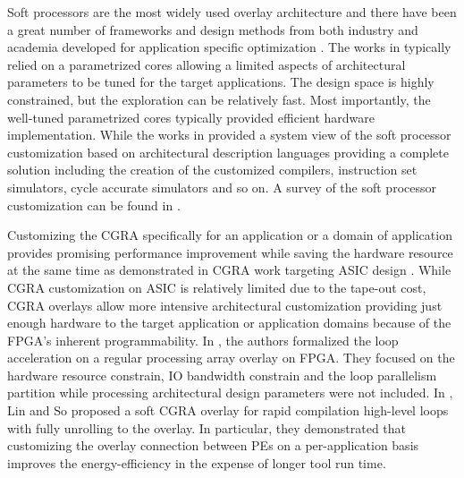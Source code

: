 Soft processors are the most widely used overlay architecture and there have been a great number of frameworks and design methods from both industry and academia developed for application specific optimization \cite{nios, microblaze,lodi2003pipelined, gries2004methods, leon, itoh2000peas, yiannacouras2005microarchitecture, dimond2005custard, chattopadhyay2006automatic}. The works in \cite{lodi2003pipelined, gries2004methods, nios, microblaze, leon} typically relied on a parametrized cores allowing a limited aspects of architectural parameters to be tuned for the target applications. The design space is highly constrained, but the exploration can be relatively fast. Most importantly, the well-tuned parametrized cores typically provided efficient hardware implementation. While the works in \cite{itoh2000peas, yiannacouras2005microarchitecture, dimond2005custard, chattopadhyay2006automatic} provided a system view of the soft processor customization based on architectural description languages providing a complete solution including the creation of the customized compilers, instruction set simulators, cycle accurate simulators and so on. A survey of the soft processor customization can be found in \cite{chattopadhyay2013ingredients, galuzzi2011instruction}. 

Customizing the CGRA specifically for an application or a domain of application provides promising performance improvement while saving the hardware resource at the same time as demonstrated in CGRA work targeting ASIC design \cite{compton2001totem, zhou2014application, miniskar2014retargetable}. While CGRA customization on ASIC is relatively limited due to the tape-out cost, CGRA overlays allow more intensive architectural customization providing just enough hardware to the target application or application domains because of the FPGA's inherent programmability. In \cite{bondhugula2007automatic}, the authors formalized the loop acceleration on a regular processing array overlay on FPGA. They focused on the hardware resource constrain, IO bandwidth constrain and the loop parallelism partition while processing architectural design parameters were not included. In \cite{lin2012energy}, Lin and So proposed a soft CGRA overlay for rapid compilation high-level loops with fully unrolling to the overlay. In particular, they demonstrated that customizing the overlay connection between PEs on a per-application basis improves the energy-efficiency in the expense of longer tool run time.

